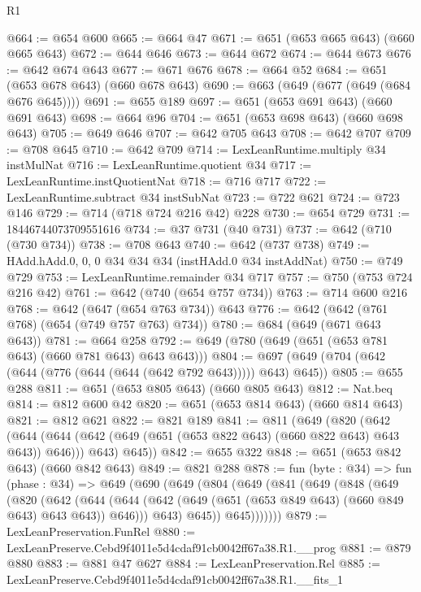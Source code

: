 \begin{lexlean}{R1}
\begin{coremodule}
@664 := @654 @600
@665 := @664 @47
@671 := @651 (@653 @665 @643) (@660 @665 @643)
@672 := @644 @646
@673 := @644 @672
@674 := @644 @673
@676 := @642 @674 @643
@677 := @671 @676
@678 := @664 @52
@684 := @651 (@653 @678 @643) (@660 @678 @643)
@690 := @663 (@649 (@677 (@649 (@684 @676 @645))))
@691 := @655 @189
@697 := @651 (@653 @691 @643) (@660 @691 @643)
@698 := @664 @96
@704 := @651 (@653 @698 @643) (@660 @698 @643)
@705 := @649 @646
@707 := @642 @705 @643
@708 := @642 @707
@709 := @708 @645
@710 := @642 @709
@714 := LexLeanRuntime.multiply @34 instMulNat
@716 := LexLeanRuntime.quotient @34
@717 := LexLeanRuntime.instQuotientNat
@718 := @716 @717
@722 := LexLeanRuntime.subtract @34 instSubNat
@723 := @722 @621
@724 := @723 @146
@729 := @714 (@718 @724 @216 @42) @228
@730 := @654 @729
@731 := 18446744073709551616
@734 := @37 @731 (@40 @731)
@737 := @642 (@710 (@730 @734))
@738 := @708 @643
@740 := @642 (@737 @738)
@749 := HAdd.hAdd.{0, 0, 0} @34 @34 @34 (instHAdd.{0} @34 instAddNat)
@750 := @749 @729
@753 := LexLeanRuntime.remainder @34 @717
@757 := @750 (@753 @724 @216 @42)
@761 := @642 (@740 (@654 @757 @734))
@763 := @714 @600 @216
@768 := @642 (@647 (@654 @763 @734)) @643
@776 := @642 (@642 (@761 @768) (@654 (@749 @757 @763) @734))
@780 := @684 (@649 (@671 @643 @643))
@781 := @664 @258
@792 := @649 (@780 (@649 (@651 (@653 @781 @643) (@660 @781 @643) @643 @643)))
@804 := @697 (@649 (@704 (@642 (@644 (@776 (@644 (@644 (@642 @792 @643))))) @643) @645))
@805 := @655 @288
@811 := @651 (@653 @805 @643) (@660 @805 @643)
@812 := Nat.beq
@814 := @812 @600 @42
@820 := @651 (@653 @814 @643) (@660 @814 @643)
@821 := @812 @621
@822 := @821 @189
@841 := @811
    (@649
      (@820
        (@642
          (@644 (@644 (@642 (@649 (@651 (@653 @822 @643) (@660 @822 @643) @643 @643)) @646)))
          @643)
        @645))
@842 := @655 @322
@848 := @651 (@653 @842 @643) (@660 @842 @643)
@849 := @821 @288
@878 := fun (byte : @34) =>
  fun (phase : @34) =>
  @649
    (@690
      (@649
        (@804
          (@649
            (@841
              (@649
                (@848
                  (@649
                    (@820
                      (@642
                        (@644
                          (@644
                            (@642 (@649 (@651 (@653 @849 @643) (@660 @849 @643) @643 @643)) @646)))
                        @643)
                      @645))
                  @645)))))))
@879 := LexLeanPreservation.FunRel
@880 := LexLeanPreserve.Cebd9f4011e5d4cdaf91cb0042ff67a38.R1.__prog
@881 := @879 @880
@883 := @881 @47 @627
@884 := LexLeanPreservation.Rel
@885 := LexLeanPreserve.Cebd9f4011e5d4cdaf91cb0042ff67a38.R1.__fits_1

\end{coremodule}
\end{lexlean}

